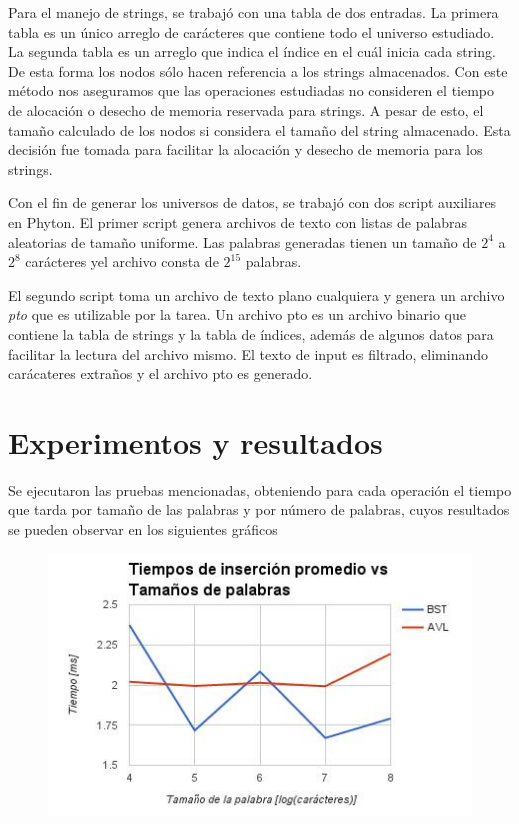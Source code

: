 \documentclass[12pt,letterpaper,hidelinks]{extarticle}
\begin{document}
Para el manejo de strings, se trabajó con una tabla de dos entradas. La primera tabla es un único arreglo de carácteres que contiene todo el universo estudiado. La segunda tabla es un arreglo que indica el índice en el cuál inicia cada string.
De esta forma los nodos sólo hacen referencia a los strings almacenados. Con este método nos aseguramos que las operaciones estudiadas no consideren el tiempo de alocación o desecho de memoria reservada para strings.
A pesar de esto, el tamaño calculado de los nodos si considera el tamaño del string almacenado.
Esta decisión fue tomada para facilitar la alocación y desecho de memoria para los strings.

Con el fin de generar los universos de datos, se trabajó con dos script auxiliares en Phyton.
El primer script genera archivos de texto con listas de palabras aleatorias de tamaño uniforme. Las palabras generadas tienen un tamaño de $2^4$ a $2^8$ carácteres yel archivo consta de $2^{15}$ palabras.

El segundo script toma un archivo de texto plano cualquiera y genera un archivo \textit{pto} que es utilizable por la tarea.
Un archivo pto es un archivo binario que contiene la tabla de strings y la tabla de índices, además de algunos datos para facilitar la lectura del archivo mismo.
El texto de input es filtrado, eliminando carácateres extraños y el archivo pto es generado.


\section{Experimentos y resultados}
	Se ejecutaron las pruebas mencionadas, obteniendo para cada operación el tiempo que tarda por tamaño de las palabras y por
	número de palabras, cuyos resultados se pueden observar en los siguientes gráficos

\newpage 
	\begin{figure}[ht!]
		\centering \includegraphics[scale=0.8]{img/ins-size.jpg}
	\end{figure}
\end{document}
